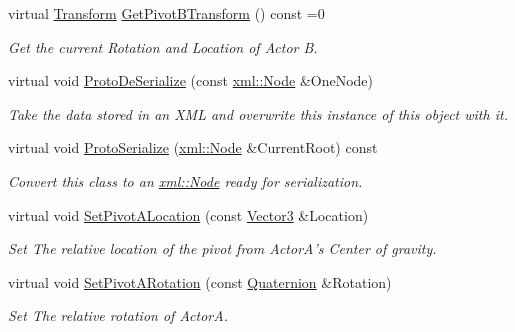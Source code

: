 \begin{DoxyCompactItemize}
virtual \hyperlink{classMezzanine_1_1Transform}{Transform} \hyperlink{classMezzanine_1_1DualTransformConstraint_a43e5f5d4cfd9b0ab7032d81df5c935d7}{GetPivotBTransform} () const =0
\begin{DoxyCompactList}\small\item\em Get the current Rotation and Location of Actor B. \item\end{DoxyCompactList}\item 
virtual void \hyperlink{classMezzanine_1_1DualTransformConstraint_aa69fcdbf84b8a509ee32d4233b96580c}{ProtoDeSerialize} (const \hyperlink{classMezzanine_1_1xml_1_1Node}{xml::Node} \&OneNode)
\begin{DoxyCompactList}\small\item\em Take the data stored in an XML and overwrite this instance of this object with it. \item\end{DoxyCompactList}\item 
virtual void \hyperlink{classMezzanine_1_1DualTransformConstraint_a8e0c729e416c6c20507ef8ac029fa819}{ProtoSerialize} (\hyperlink{classMezzanine_1_1xml_1_1Node}{xml::Node} \&CurrentRoot) const 
\begin{DoxyCompactList}\small\item\em Convert this class to an \hyperlink{classMezzanine_1_1xml_1_1Node}{xml::Node} ready for serialization. \item\end{DoxyCompactList}\item 
virtual void \hyperlink{classMezzanine_1_1DualTransformConstraint_a3dc5e7afcf612a481f81071201ecdeb7}{SetPivotALocation} (const \hyperlink{classMezzanine_1_1Vector3}{Vector3} \&Location)
\begin{DoxyCompactList}\small\item\em Set The relative location of the pivot from ActorA's Center of gravity. \item\end{DoxyCompactList}\item 
virtual void \hyperlink{classMezzanine_1_1DualTransformConstraint_a73cba60ff65f8ac2775b19f74e5cbe9e}{SetPivotARotation} (const \hyperlink{classMezzanine_1_1Quaternion}{Quaternion} \&Rotation)
\begin{DoxyCompactList}\small\item\em Set The relative rotation of ActorA. \item\end{DoxyCompactList}\item 

\end{DoxyCompactItemize}
